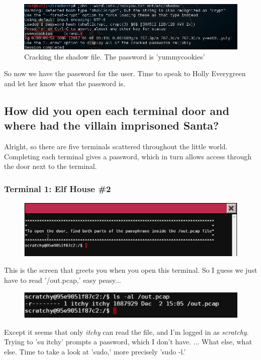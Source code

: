 \documentclass[writeup.tex]{subfiles}
\begin{document}
		\begin{figure}[H]
			\centering
			\includegraphics[width=\linewidth]{screenshots/cranbian_cracked}
			\caption{Cracking the shadow file. The password is 'yummycookies'}
			\label{fig.cranbian_cracked}
		\end{figure}
		
		So now we have the password for the user. Time to speak to Holly Everygreen and let her know what the password is.

		
	\subsection{How did you open each terminal door and where had the villain imprisoned Santa?}
		Alright, so there are five terminals scattered throughout the little world. Completing each terminal gives a password, which in turn allows access through the door next to the terminal.
		
		\subsubsection{Terminal 1: Elf House \#2} \label{terminal1}
			\begin{figure}[H]
				\centering
				\includegraphics[width=\linewidth]{"screenshots/terminals/Terminal 1 - First"}
			\end{figure}
			
			This is the screen that greets you when you open this terminal. So I guess we just have to read '/out.pcap,' easy peasy...
			\begin{figure}[H]
				\centering
				\includegraphics[scale=1]{"screenshots/terminals/Terminal 1 - ls pcap"}
			\end{figure}
			Except it seems that only \textit{itchy} can read the file, and I'm logged in as \textit{scratchy}. Trying to 'su itchy' prompts a password, which I don't have. ... What else, what else. Time to take a look at 'sudo,' more precisely 'sudo -l.'
			
\end{document}
